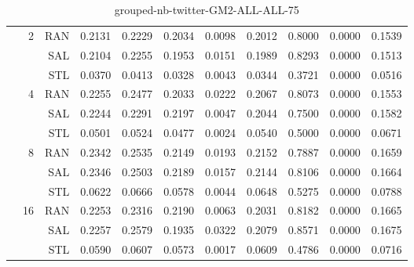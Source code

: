 \begin{center}
\begin{table}[htbp]
\begin{tabular}{ | r | r | r | r | r | r | r | r | r | r | r |}
 & \multirow{3}{*}{2} & RAN & 0.2131 & 0.2229 & 0.2034 & 0.0098 & 0.2012 & 0.8000 & 0.0000 & 0.1539\\ \cline{3-11}
 &   & SAL & 0.2104 & 0.2255 & 0.1953 & 0.0151 & 0.1989 & 0.8293 & 0.0000 & 0.1513\\ \cline{3-11}
 &   & STL & 0.0370 & 0.0413 & 0.0328 & 0.0043 & 0.0344 & 0.3721 & 0.0000 & 0.0516\\ \cline{2-11}
 & \multirow{3}{*}{4} & RAN & 0.2255 & 0.2477 & 0.2033 & 0.0222 & 0.2067 & 0.8073 & 0.0000 & 0.1553\\ \cline{3-11}
 &   & SAL & 0.2244 & 0.2291 & 0.2197 & 0.0047 & 0.2044 & 0.7500 & 0.0000 & 0.1582\\ \cline{3-11}
 &   & STL & 0.0501 & 0.0524 & 0.0477 & 0.0024 & 0.0540 & 0.5000 & 0.0000 & 0.0671\\ \cline{2-11}
 & \multirow{3}{*}{8} & RAN & 0.2342 & 0.2535 & 0.2149 & 0.0193 & 0.2152 & 0.7887 & 0.0000 & 0.1659\\ \cline{3-11}
 &   & SAL & 0.2346 & 0.2503 & 0.2189 & 0.0157 & 0.2144 & 0.8106 & 0.0000 & 0.1664\\ \cline{3-11}
 &   & STL & 0.0622 & 0.0666 & 0.0578 & 0.0044 & 0.0648 & 0.5275 & 0.0000 & 0.0788\\ \cline{2-11}
 & \multirow{3}{*}{16} & RAN & 0.2253 & 0.2316 & 0.2190 & 0.0063 & 0.2031 & 0.8182 & 0.0000 & 0.1665\\ \cline{3-11}
 &   & SAL & 0.2257 & 0.2579 & 0.1935 & 0.0322 & 0.2079 & 0.8571 & 0.0000 & 0.1675\\ \cline{3-11}
 &   & STL & 0.0590 & 0.0607 & 0.0573 & 0.0017 & 0.0609 & 0.4786 & 0.0000 & 0.0716\\ \cline{2-11}
\hline
\end{tabular}
\caption{grouped-nb-twitter-GM2-ALL-ALL-75}
\end{table}
\end{center}

